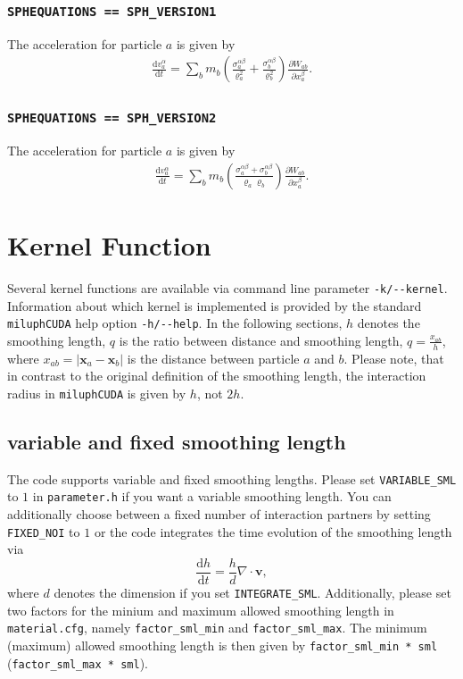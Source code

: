 \documentclass[10pt,fleqn,twoside]{article}
\renewcommand{\vec}[1]{{\mathbf #1}}
\begin{document}
\subsubsection{\texttt{SPHEQUATIONS == SPH\_VERSION1}}
The acceleration for particle $a$ is given by
\begin{align}
    \frac{\mathrm{d} v^\alpha_a}{\mathrm{d} t} = \sum_b m_b \left( \frac{\sigma^{\alpha
    \beta}_a}{\varrho_a^2} + \frac{\sigma^{\alpha \beta}_b}{\varrho_b^2} \right ) \frac{\partial
    W_{ab}}{\partial x_a^\beta}.
\end{align}
\subsubsection{\texttt{SPHEQUATIONS == SPH\_VERSION2}}
The acceleration for particle $a$ is given by
\begin{align}
    \frac{\mathrm{d} v^\alpha_a}{\mathrm{d} t} = \sum_b m_b \left( \frac{\sigma^{\alpha
    \beta}_a + \sigma^{\alpha \beta}_b}{\varrho_a  \varrho_b} \right ) \frac{\partial
    W_{ab}}{\partial x_a^\beta}.
\end{align}

\section{Kernel Function}
Several kernel functions are available via command line parameter \texttt{-k/-{}-kernel}. Information about
which kernel is implemented is provided by the standard \texttt{miluphCUDA} help option \texttt{-h/-{}-help}.
In the following sections, $h$ denotes the smoothing length, $q$ is the ratio between distance and
smoothing length, $q=\frac{x_{ab}}{h}$, where $x_{ab}=\left|{\mathbf{x}_a -
\mathbf{x}_b}\right|$ is the distance between particle $a$ and $b$. Please note, that in contrast to
the original definition of the smoothing length, the interaction radius in \texttt{miluphCUDA} is
given by $h$, not $2h$.

\subsection{variable and fixed smoothing length}
The code supports variable and fixed smoothing lengths. Please set \texttt{VARIABLE\_SML} to $1$ in \texttt{parameter.h}
if you want a variable smoothing length. You can additionally choose between a fixed number of interaction partners by setting
\texttt{FIXED\_NOI} to $1$ or the code integrates the time evolution of the smoothing length via
\begin{equation}
    \frac{\mathrm{d} h}{\mathrm{d}t} = \frac{h}{d} \nabla \cdot \vec{v},
\end{equation}
where $d$ denotes the dimension if you set \texttt{INTEGRATE\_SML}. Additionally, please set two factors for the minium and maximum allowed smoothing length
in \texttt{material.cfg}, namely \texttt{factor\_sml\_min} and \texttt{factor\_sml\_max}. The minimum  (maximum) allowed
smoothing length is then given by \texttt{factor\_sml\_min * sml} (\texttt{factor\_sml\_max * sml}).
\end{document}
